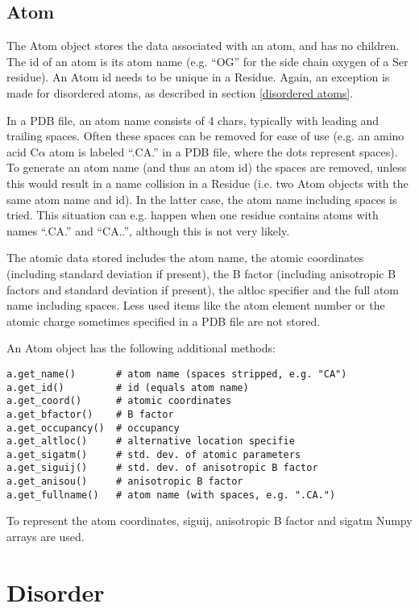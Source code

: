 \documentclass{report}
\begin{document}
\subsection{Atom}

The Atom object stores the data associated with an atom, and has no children.
The id of an atom is its atom name (e.g. {}``OG{}'' for the side chain oxygen
of a Ser residue). An Atom id needs to be unique in a Residue. Again, an exception
is made for disordered atoms, as described in section \ref{disordered atoms}.

In a PDB file, an atom name consists of 4 chars, typically with leading and
trailing spaces. Often these spaces can be removed for ease of use (e.g. an
amino acid C\( \alpha  \) atom is labeled {}``.CA.{}'' in a PDB file, where
the dots represent spaces). To generate an atom name (and thus an atom id) the
spaces are removed, unless this would result in a name collision in a Residue
(i.e. two Atom objects with the same atom name and id). In the latter case,
the atom name including spaces is tried. This situation can e.g. happen when
one residue contains atoms with names {}``.CA.{}'' and {}``CA..{}'', although
this is not very likely.

The atomic data stored includes the atom name, the atomic coordinates (including
standard deviation if present), the B factor (including anisotropic B factors
and standard deviation if present), the altloc specifier and the full atom name
including spaces. Less used items like the atom element number or the atomic
charge sometimes specified in a PDB file are not stored.

An Atom object has the following additional methods:

\begin{verbatim}
a.get_name()       # atom name (spaces stripped, e.g. "CA")
a.get_id()         # id (equals atom name)
a.get_coord()      # atomic coordinates
a.get_bfactor()    # B factor
a.get_occupancy()  # occupancy
a.get_altloc()     # alternative location specifie
a.get_sigatm()     # std. dev. of atomic parameters
a.get_siguij()     # std. dev. of anisotropic B factor
a.get_anisou()     # anisotropic B factor
a.get_fullname()   # atom name (with spaces, e.g. ".CA.")
\end{verbatim}

To represent the atom coordinates, siguij, anisotropic B factor and sigatm Numpy
arrays are used.

\section{Disorder}
\end{document}
